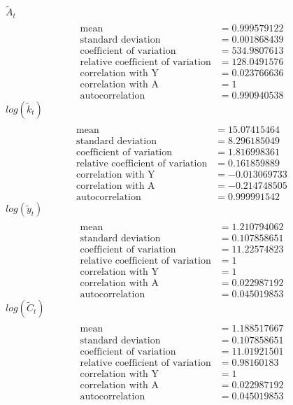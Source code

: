 \documentclass[letterpaper,12pt]{article}
\theoremstyle{definition}
\begin{document}
$\tilde{A}_t$
\begin{align*}
\\\text{mean} &= 0.999579122
\\\text{standard deviation} &= 	0.001868439
\\\text{coefficient of variation}&=534.9807613
\\\text{relative coefficient of variation}&=128.0491576
\\\text{correlation with Y}&=0.023766636
\\\text{correlation with A}&=1
\\\text{autocorrelation}&=0.990940538
\end{align*}
$log(\tilde{k}_t)$
\begin{align*}
\\\text{mean} &= 15.07415464
\\\text{standard deviation} &= 	8.296185049
\\\text{coefficient of variation}&=1.816998361
\\\text{relative coefficient of variation}&=0.161859889
\\\text{correlation with Y}&=-0.013069733
\\\text{correlation with A}&=-0.214748505
\\\text{autocorrelation}&=0.999991542
\end{align*}
$log(\tilde{y}_t)$
\begin{align*}
\\\text{mean} &= 1.210794062
\\\text{standard deviation} &= 	0.107858651
\\\text{coefficient of variation}&=11.22574823
\\\text{relative coefficient of variation}&=1
\\\text{correlation with Y}&=1
\\\text{correlation with A}&=0.022987192
\\\text{autocorrelation}&=0.045019853
\end{align*}
$log(\tilde{C}_t)$
\begin{align*}
\\\text{mean} &= 1.188517667	
\\\text{standard deviation} &= 0.107858651
\\\text{coefficient of variation}&=11.01921501
\\\text{relative coefficient of variation}&=0.98160183
\\\text{correlation with Y}&=1
\\\text{correlation with A}&=0.022987192
\\\text{autocorrelation}&=0.045019853
\end{align*}
\end{document}
